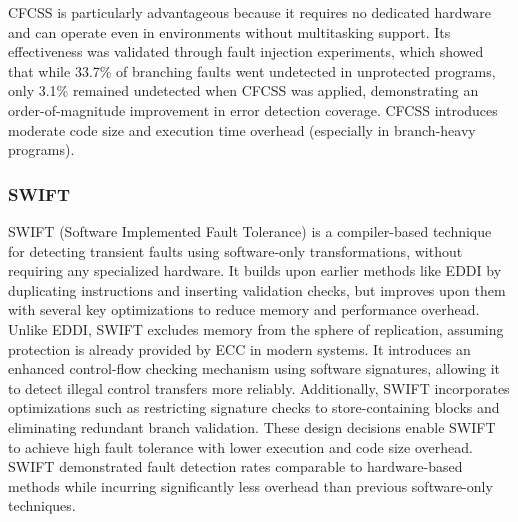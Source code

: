 CFCSS is particularly advantageous because it requires no dedicated hardware and can operate even in environments without multitasking support. Its effectiveness was validated through fault injection experiments, which showed that while 33.7\% of branching faults went undetected in unprotected programs, only 3.1\% remained undetected when CFCSS was applied, demonstrating an order-of-magnitude improvement in error detection coverage. CFCSS introduces moderate code size and execution time overhead (especially in branch-heavy programs).

\subsubsection{SWIFT}

SWIFT \cite{swift} (Software Implemented Fault Tolerance) is a compiler-based technique for detecting transient faults using software-only transformations, without requiring any specialized hardware. It builds upon earlier methods like EDDI by duplicating instructions and inserting validation checks, but improves upon them with several key optimizations to reduce memory and performance overhead. Unlike EDDI, SWIFT excludes memory from the sphere of replication, assuming protection is already provided by ECC in modern systems. It introduces an enhanced control-flow checking mechanism using software signatures, allowing it to detect illegal control transfers more reliably. Additionally, SWIFT incorporates optimizations such as restricting signature checks to store-containing blocks and eliminating redundant branch validation. These design decisions enable SWIFT to achieve high fault tolerance with lower execution and code size overhead. SWIFT demonstrated fault detection rates comparable to hardware-based methods while incurring significantly less overhead than previous software-only techniques.